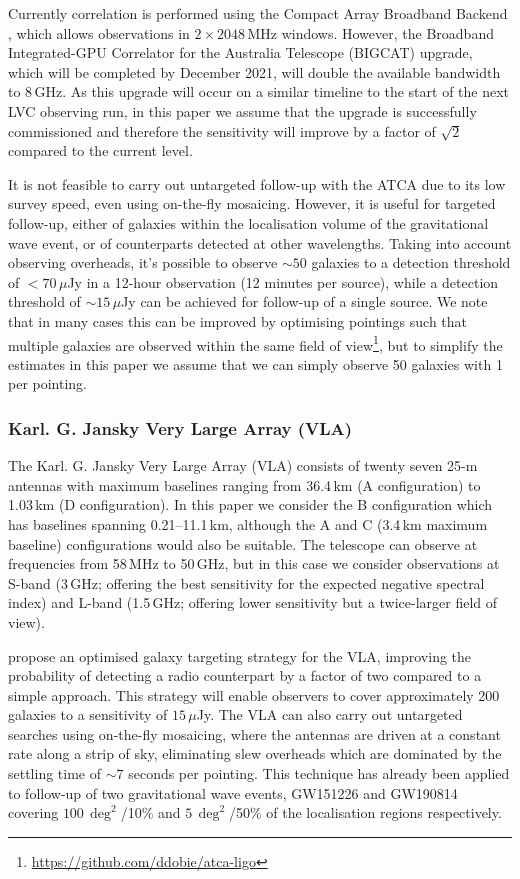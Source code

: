 Currently correlation is performed using the Compact Array Broadband Backend \citep{2011MNRAS.416..832W}, which allows observations in $2\times2048$\,MHz windows. However, the Broadband Integrated-GPU Correlator for the Australia Telescope (BIGCAT) upgrade, which will be completed by December 2021, will double the available bandwidth to 8\,GHz. As this upgrade will occur on a similar timeline to the start of the next LVC observing run, in this paper we assume that the upgrade is successfully commissioned and therefore the sensitivity will improve by a factor of $\sqrt{2}$ compared to the current level.

It is not feasible to carry out untargeted follow-up with the ATCA due to its low survey speed, even using on-the-fly mosaicing. However, it is useful for targeted follow-up, either of galaxies within the localisation volume of the gravitational wave event, or of counterparts detected at other wavelengths. Taking into account observing overheads, it's possible to observe $\sim 50$ galaxies to a detection threshold of $<70\,\mu$Jy in a 12-hour observation (12 minutes per source), while a detection threshold of $\sim 15\,\mu$Jy can be achieved for follow-up of a single source. We note that in many cases this can be improved by optimising pointings such that multiple galaxies are observed within the same field of view\footnote{\url{https://github.com/ddobie/atca-ligo}}, but to simplify the estimates in this paper we assume that we can simply observe 50 galaxies with 1 per pointing.


\subsubsection{Karl. G. Jansky Very Large Array (VLA)}
The Karl. G. Jansky Very Large Array (VLA) consists of twenty seven 25-m antennas with maximum baselines ranging from 36.4\,km (A configuration) to 1.03\,km (D configuration). In this paper we consider the B configuration which has baselines spanning 0.21--11.1\,km, although the A and C (3.4\,km maximum baseline) configurations would also be suitable. The telescope can observe at frequencies from 58\,MHz to 50\,GHz, but in this case we consider observations at S-band (3\,GHz; offering the best sensitivity for the expected negative spectral index) and L-band (1.5\,GHz; offering lower sensitivity but a twice-larger field of view).

\citet{2019arXiv190407335R} propose an optimised galaxy targeting strategy for the VLA, improving the probability of detecting a radio counterpart by a factor of two compared to a simple approach. This strategy will enable observers to cover approximately 200 galaxies to a sensitivity of $15\,\mu$Jy. The VLA can also carry out untargeted searches using on-the-fly mosaicing, where the antennas are driven at a constant rate along a strip of sky, eliminating slew overheads which are dominated by the settling time of $\sim 7$ seconds per pointing. This technique has already been applied to follow-up of two gravitational wave events, GW151226 \citep{2016PhRvL.116x1103A} and GW190814 \citep{2020ApJ...896L..44A} covering $100\,\deg^2$/10\% \citep{2018ApJ...857..143M} and $5\,\deg^2$/50\% \citep{2019GCN.25690....1M} of the localisation regions respectively.

